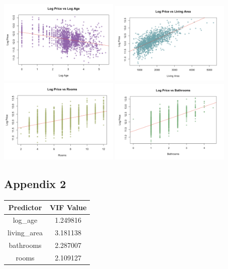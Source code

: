 \documentclass[
  twocolumn]{article}
\begin{document}
\includegraphics[width=0.43\textwidth,height=\textheight]{A1 log age.png}
\includegraphics[width=0.43\textwidth,height=\textheight]{A1 Living Area.png}
\includegraphics[width=0.43\textwidth,height=\textheight]{A1 Rooms.png}
\includegraphics[width=0.43\textwidth,height=\textheight]{A1 Bathrooms.png}

\subsection{Appendix 2}\label{appendix-2}

\begin{table}[H]
\centering
\begin{tabular}{|c|c|}
\hline
\textbf{Predictor} & \textbf{VIF Value} \\
\hline
log\_age & 1.249816 \\
living\_area & 3.181138 \\
bathrooms & 2.287007 \\
rooms & 2.109127 \\
\hline
\end{tabular}
\end{table}
\end{document}
